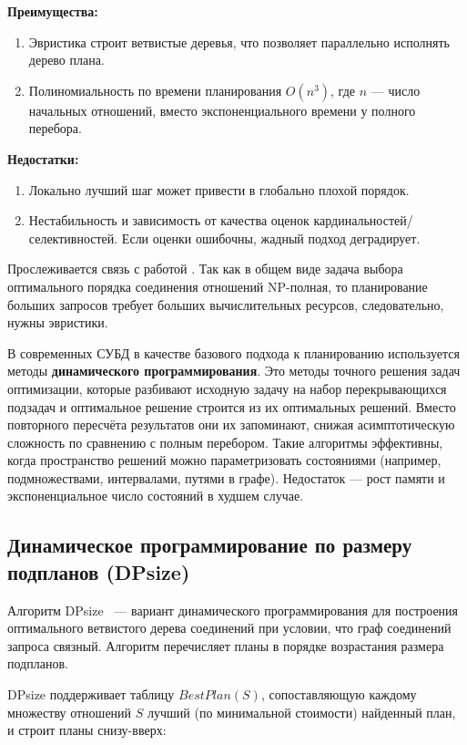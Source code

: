 \textbf{Преимущества:}
\begin{enumerate}
    \item Эвристика строит ветвистые деревья, что позволяет параллельно исполнять дерево плана.
    \item Полиномиальность по времени планирования $O(n^3)$, где $n$ --- число начальных отношений, вместо экспоненциального времени у полного перебора.
\end{enumerate}

\textbf{Недостатки:}
\begin{enumerate}
    \item Локально лучший шаг может привести в глобально плохой порядок.
    \item Нестабильность и зависимость от качества оценок кардинальностей/селективностей. Если оценки ошибочны, 
    жадный подход деградирует.
\end{enumerate}

Прослеживается связь с работой \cite{IK}. Так как в общем виде задача выбора оптимального порядка соединения отношений NP-полная,
то планирование больших запросов требует больших вычислительных ресурсов, следовательно, нужны эвристики.
\par

В современных СУБД в качестве базового подхода к планированию используется методы \textbf{динамического программирования}.
Это методы точного решения задач оптимизации, которые разбивают исходную задачу на набор перекрывающихся подзадач 
и оптимальное решение строится из их оптимальных решений. Вместо повторного пересчёта результатов они их запоминают, 
снижая асимптотическую сложность по сравнению с полным перебором. Такие алгоритмы  эффективны, когда пространство решений можно 
параметризовать состояниями (например, подмножествами, интервалами, путями в графе). Недостаток — рост памяти и экспоненциальное число состояний в худшем случае.


\subsection{Динамическое программирование по размеру подпланов (DPsize)}


Алгоритм DPsize\cite{SizeSub} ~--- вариант динамического программирования для построения
оптимального ветвистого дерева соединений при условии, что граф соединений запроса связный.
Алгоритм перечисляет планы в порядке возрастания размера подпланов.

DPsize поддерживает таблицу $BestPlan(S)$, сопоставляющую каждому множеству отношений $S$ лучший (по минимальной стоимости) найденный план, и строит планы снизу-вверх:

